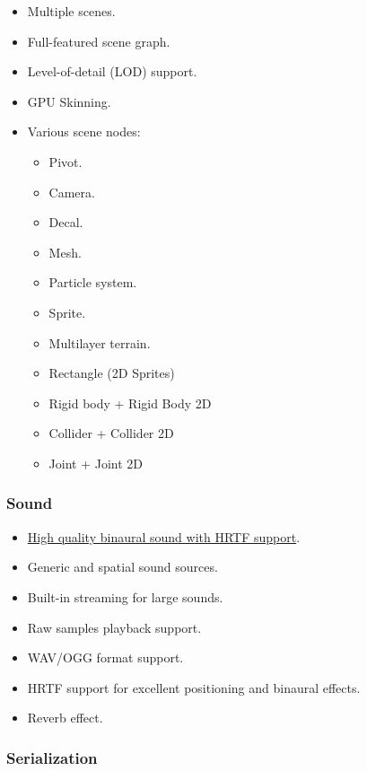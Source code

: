 \documentclass[
]{book}
\providecommand{\tightlist}{%
  \setlength{\itemsep}{0pt}\setlength{\parskip}{0pt}}
\theoremstyle{definition}
\theoremstyle{definition}
\theoremstyle{definition}
\theoremstyle{definition}
\theoremstyle{remark}
\begin{document}
\begin{itemize}
\tightlist
\item
  Multiple scenes.
\item
  Full-featured scene graph.
\item
  Level-of-detail (LOD) support.
\item
  GPU Skinning.
\item
  Various scene nodes:

  \begin{itemize}
  \tightlist
  \item
    Pivot.
  \item
    Camera.
  \item
    Decal.
  \item
    Mesh.
  \item
    Particle system.
  \item
    Sprite.
  \item
    Multilayer terrain.
  \item
    Rectangle (2D Sprites)
  \item
    Rigid body + Rigid Body 2D
  \item
    Collider + Collider 2D
  \item
    Joint + Joint 2D
  \end{itemize}
\end{itemize}

\subsubsection{Sound}\label{sound}

\begin{itemize}
\tightlist
\item
  \href{https://github.com/FyroxEngine/Fyrox/tree/master/fyrox-sound}{High quality binaural sound with HRTF support}.
\item
  Generic and spatial sound sources.
\item
  Built-in streaming for large sounds.
\item
  Raw samples playback support.
\item
  WAV/OGG format support.
\item
  HRTF support for excellent positioning and binaural effects.
\item
  Reverb effect.
\end{itemize}

\subsubsection{Serialization}\label{serialization}
\end{document}
